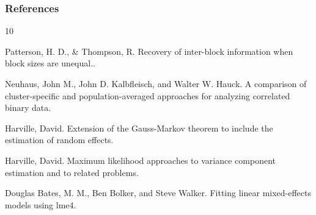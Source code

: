 \documentclass{beamer}
\begin{document}
\begin{frame}[allowframebreaks]
  \frametitle{References}    
  \begin{thebibliography}{10}    


            \beamertemplatearticlebibitems
  Patterson, H. D., \& Thompson, R.
    \newblock Recovery of inter-block information when block sizes are unequal..
    
    
            \beamertemplatearticlebibitems
Neuhaus, John M., John D. Kalbfleisch, and Walter W. Hauck.
    \newblock A comparison of cluster-specific and population-averaged approaches for analyzing correlated binary data.
    
       \beamertemplatearticlebibitems
   Harville, David.
    \newblock Extension of the Gauss-Markov theorem to include the estimation of random effects.
    
    
                    \beamertemplatearticlebibitems
   Harville, David.
    \newblock Maximum likelihood approaches to variance component estimation and to related problems.
    
    
          \beamertemplatearticlebibitems
Douglas Bates, M. M., Ben Bolker, and Steve Walker.
    \newblock Fitting linear mixed-effects models using lme4.
    
  \end{thebibliography}
\end{frame}
\end{document}
